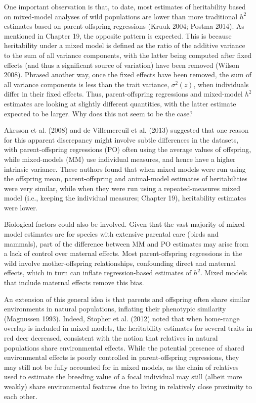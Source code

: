 \documentclass{article}
\begin{document}
One important observation is that, to date, most estimates of heritability based on mixed-model analyses of wild populations are lower than more traditional  $ h^{2} $ estimates based on parent-offspring regressions (Kruuk 2004; Postma 2014). As mentioned in Chapter 19, the opposite pattern is expected. This is because heritability under a mixed model is defined as the ratio of the additive variance to the sum of all variance components, with the latter being computed after fixed effects (and thus a significant source of variation) have been removed (Wilson 2008). Phrased another way, once the fixed effects have been removed, the sum of all variance components is less than the trait variance,  $ \sigma^{2}(z) $, when individuals differ in their fixed effects. Thus, parent-offspring regressions and mixed-model  $ h^{2} $ estimates are looking at slightly different quantities, with the latter estimate expected to be larger. Why does this not seem to be the case?

Akesson et al. (2008) and de Villemereuil et al. (2013) suggested that one reason for this apparent discrepancy might involve subtle differences in the datasets, with parent-offspring regressions (PO) often using the average values of offspring, while mixed-models (MM) use individual measures, and hence have a higher intrinsic variance. These authors found that when mixed models were run using the offspring mean, parent-offspring and animal-model estimates of heritabilities were very similar, while when they were run using a repeated-measures mixed model (i.e., keeping the individual measures; Chapter 19), heritability estimates were lower.

Biological factors could also be involved. Given that the vast majority of mixed-model estimates are for species with extensive parental care (birds and mammals), part of the difference between MM and PO estimates may arise from a lack of control over maternal effects. Most parent-offspring regressions in the wild involve mother-offspring relationships, confounding direct and maternal effects, which in turn can inflate regression-based estimates of  $ h^{2} $. Mixed models that include maternal effects remove this bias.

An extension of this general idea is that parents and offspring often share similar environments in natural populations, inflating their phenotypic similarity (Magnussen 1993). Indeed, Stopher et al. (2012) noted that when home-range overlap is included in mixed models, the heritability estimates for several traits in red deer decreased, consistent with the notion that relatives in natural populations share environmental effects. While the potential presence of shared environmental effects is poorly controlled in parent-offspring regressions, they may still not be fully accounted for in mixed models, as the chain of relatives used to estimate the breeding value of a focal individual may still (albeit more weakly) share environmental features due to living in relatively close proximity to each other.
\end{document}
